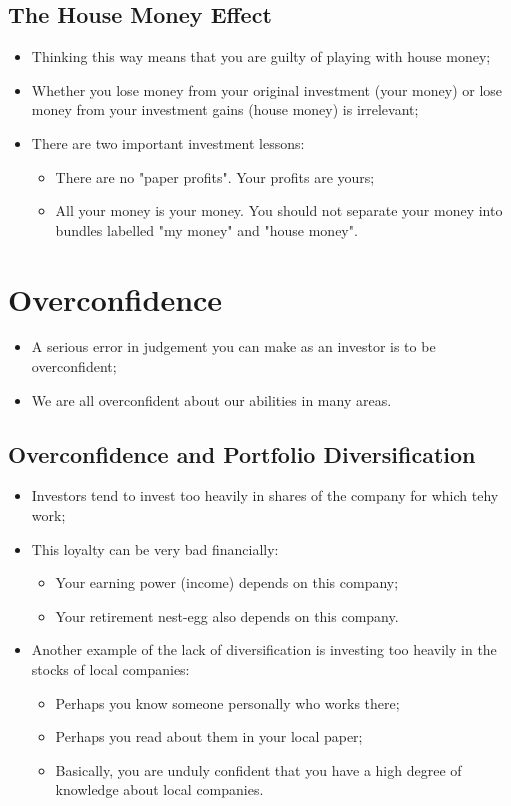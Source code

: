 \documentclass[11pt,a4paper]{report}
\begin{document}
    \subsection{The House Money Effect}
    \begin{itemize}
        \item Thinking this way means that you are guilty of playing with house money;
        \item Whether you lose money from your original investment (your money) or lose money from your investment gains (house money) is irrelevant;
        \item There are two important investment lessons:
        \begin{itemize}
            \item There are no "paper profits". Your profits are yours;
            \item All your money is your money. You should not separate your money into bundles labelled "my money" and "house money".
        \end{itemize}
    \end{itemize}
\section{Overconfidence}
\begin{itemize}
    \item A serious error in judgement you can make as an investor is to be overconfident;
    \item We are all overconfident about our abilities in many areas.
\end{itemize}
\subsection{Overconfidence and Portfolio Diversification}
\begin{itemize}
    \item Investors tend to invest too heavily in shares of the company for which tehy work;
    \item This loyalty can be very bad financially:
    \begin{itemize}
        \item Your earning power (income) depends on this company;
        \item Your retirement nest-egg also depends on this company.
    \end{itemize}
    \item Another example of the lack of diversification is investing too heavily in the stocks of local companies:
    \begin{itemize}
        \item Perhaps you know someone personally who works there;
        \item Perhaps you read about them in your local paper;
        \item Basically, you are unduly confident that you have a high degree of knowledge about local companies.
    \end{itemize}
\end{itemize}
\end{document}
